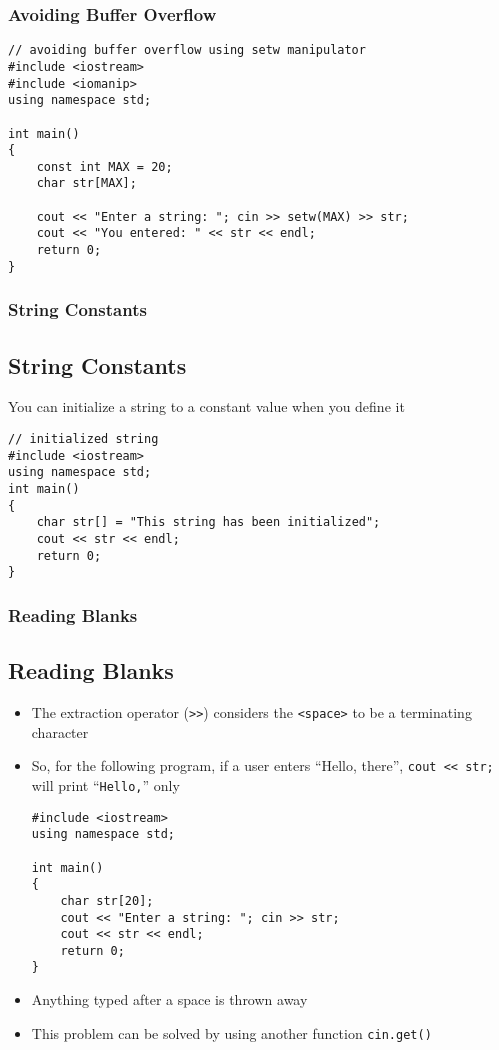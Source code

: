 \documentclass{beamer}
\begin{document}
\begin{frame}[fragile]\frametitle{Avoiding Buffer Overflow}
    \lstset{style=mystyle}
\begin{lstlisting}
// avoiding buffer overflow using setw manipulator
#include <iostream>
#include <iomanip>
using namespace std;

int main()
{
    const int MAX = 20;
    char str[MAX];

    cout << "Enter a string: "; cin >> setw(MAX) >> str;
    cout << "You entered: " << str << endl;
    return 0;
}
\end{lstlisting}
\end{frame}

\begin{frame}[fragile]\frametitle{String Constants}
    \subsection{String Constants} %
    \label{sub:string_constants}
    You can initialize a string to a constant value when you define it
    \lstset{style=mystyle}
\begin{lstlisting}
// initialized string
#include <iostream>
using namespace std;
int main()
{
    char str[] = "This string has been initialized";
    cout << str << endl;
    return 0;
}
\end{lstlisting}
\end{frame}

\begin{frame}[fragile]\frametitle{Reading Blanks}
    \subsection{Reading Blanks} %
    \label{sub:reading_blanks}
    \begin{itemize}
        \item The extraction operator (\texttt{>>}) considers the \texttt{<space>} to be a terminating character
        \item So, for the following program, if a user enters ``Hello, there'', \texttt{cout << str;} will print ``\texttt{Hello,}'' only
        \lstset{style=mystyle}
\begin{lstlisting}
#include <iostream>
using namespace std;

int main()
{
    char str[20];
    cout << "Enter a string: "; cin >> str;
    cout << str << endl;
    return 0;
}
\end{lstlisting}
        \item Anything typed after a space is thrown away
        \item This problem can be solved by using another function \texttt{cin.get()}
    \end{itemize}
\end{frame}
\end{document}
